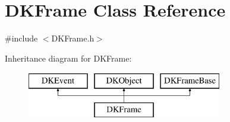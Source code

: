 \hypertarget{class_d_k_frame}{\section{D\-K\-Frame Class Reference}
\label{class_d_k_frame}
}


{\ttfamily \#include $<$D\-K\-Frame.\-h$>$}

Inheritance diagram for D\-K\-Frame\-:\begin{figure}[H]
\begin{center}
\leavevmode
\includegraphics[height=2.000000cm]{class_d_k_frame}
\end{center}
\end{figure}
